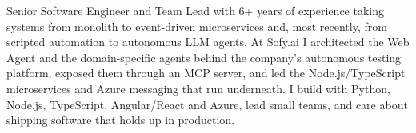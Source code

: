 
\begin{cvparagraph}
Senior Software Engineer and Team Lead with 6+ years of experience taking systems from monolith to event-driven microservices and, most recently, from scripted automation to autonomous LLM agents. At Sofy.ai I architected the Web Agent and the domain-specific agents behind the company's autonomous testing platform, exposed them through an MCP server, and led the Node.js/TypeScript microservices and Azure messaging that run underneath. I build with Python, Node.js, TypeScript, Angular/React and Azure, lead small teams, and care about shipping software that holds up in production.
\end{cvparagraph}
